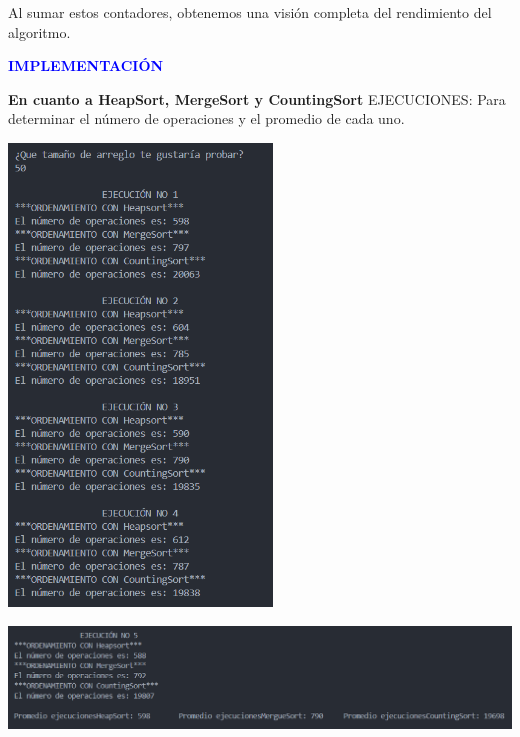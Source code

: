 \documentclass[12pt]{article}
\begin{document}
\par\vspace{0.4cm}
Al sumar estos contadores, obtenemos una visión completa del rendimiento del algoritmo.
\par\vspace{0.6cm}
\newpage
\textcolor{blue}{\textbf{IMPLEMENTACIÓN}}
\par\vspace{0.4cm}
\textbf{En cuanto a HeapSort, MergeSort y CountingSort}
EJECUCIONES: Para determinar el número de operaciones y el promedio de cada uno.
\par\vspace{0.4cm}
\includegraphics[width=7cm]{Images/Tam.50/1.png}
\par\vspace{0cm}
\includegraphics[width=16cm]{Images/Tam.50/2.png}
\newpage
\par\vspace{0.4cm}
\end{document}
